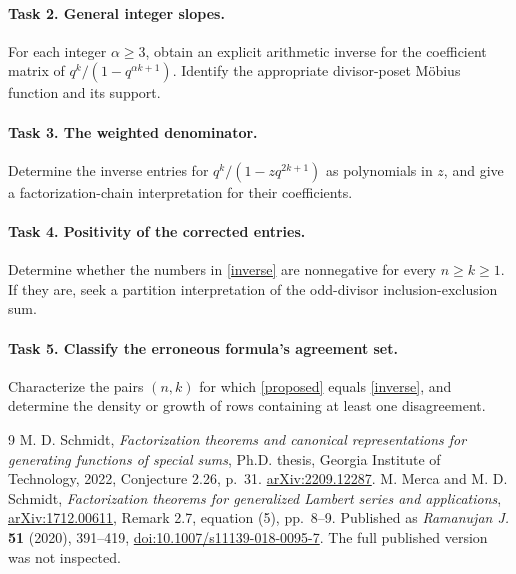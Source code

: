 \documentclass[11pt]{article}
\begin{document}
\paragraph{Task 2. General integer slopes.}
For each integer $\alpha\geq3$, obtain an explicit arithmetic inverse for
the coefficient matrix of $q^k/(1-q^{\alpha k+1})$.
Identify the appropriate divisor-poset M\"obius function and its support.
\paragraph{Task 3. The weighted denominator.}
Determine the inverse entries for $q^k/(1-zq^{2k+1})$ as polynomials in $z$,
and give a factorization-chain interpretation for their coefficients.
\paragraph{Task 4. Positivity of the corrected entries.}
Determine whether the numbers in \eqref{inverse} are nonnegative for every
$n\geq k\geq1$. If they are, seek a partition interpretation of the
odd-divisor inclusion-exclusion sum.
\paragraph{Task 5. Classify the erroneous formula's agreement set.}
Characterize the pairs $(n,k)$ for which \eqref{proposed} equals
\eqref{inverse}, and determine the density or growth of rows containing
at least one disagreement.

\begin{thebibliography}{9}
 M. D. Schmidt,
\emph{Factorization theorems and canonical representations for generating
functions of special sums}, Ph.D. thesis, Georgia Institute of Technology,
2022, Conjecture 2.26, p.~31.
\href{https://arxiv.org/abs/2209.12287}{arXiv:2209.12287}.
 M. Merca and M. D. Schmidt,
\emph{Factorization theorems for generalized Lambert series and applications},
\href{https://arxiv.org/abs/1712.00611}{arXiv:1712.00611}, Remark 2.7,
equation (5), pp.~8--9.
Published as \emph{Ramanujan J.} \textbf{51} (2020), 391--419,
\href{https://doi.org/10.1007/s11139-018-0095-7}{doi:10.1007/s11139-018-0095-7}.
The full published version was not inspected.
\end{thebibliography}
\end{document}
